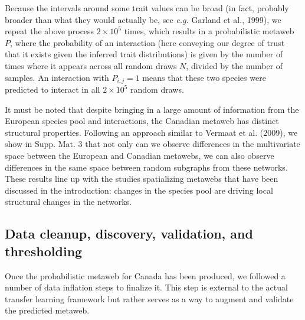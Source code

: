 \documentclass[10pt,oneside]{article}
\begin{document}
Because the intervals around some trait values can be broad (in fact,
probably broader than what they would actually be, see \emph{e.g.}
Garland et al., 1999), we repeat the above process \(2\times 10^5\)
times, which results in a probabilistic metaweb \(P\), where the
probability of an interaction (here conveying our degree of trust that
it exists given the inferred trait distributions) is given by the number
of times where it appears across all random draws \(N\), divided by the
number of samples. An interaction with \(P_{i,j} = 1\) means that these
two species were predicted to interact in all \(2\times 10^5\) random
draws.

It must be noted that despite bringing in a large amount of information
from the European species pool and interactions, the Canadian metaweb
has distinct structural properties. Following an approach similar to
Vermaat et al. (2009), we show in Supp. Mat. 3 that not only can we
observe differences in the multivariate space between the European and
Canadian metawebs, we can also observe differences in the same space
between random subgraphs from these networks. These results line up with
the studies spatializing metawebs that have been discussed in the
introduction: changes in the species pool are driving local structural
changes in the networks.

\hypertarget{data-cleanup-discovery-validation-and-thresholding}{%
\subsection{Data cleanup, discovery, validation, and
thresholding}\label{data-cleanup-discovery-validation-and-thresholding}}

Once the probabilistic metaweb for Canada has been produced, we followed
a number of data inflation steps to finalize it. This step is external
to the actual transfer learning framework but rather serves as a way to
augment and validate the predicted metaweb.
\end{document}
